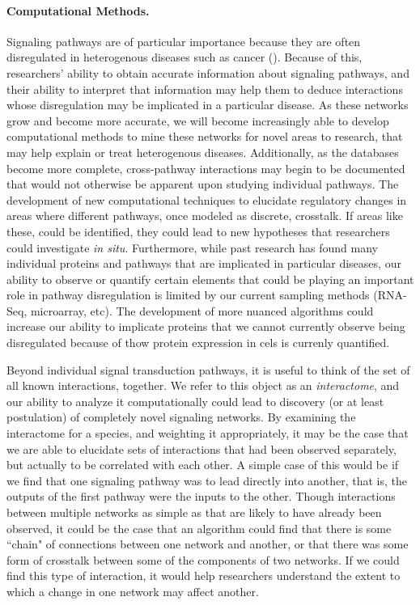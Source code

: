 \documentclass[12pt,twoside]{reedthesis}
\theoremstyle{definition}
\begin{document}
\paragraph{Computational Methods.}
Signaling pathways are of particular importance because they are often disregulated in heterogenous diseases such as cancer (\cite{Taylor2009}). Because of this, researchers' ability to obtain accurate information about signaling pathways, and their ability to interpret that information may help them to deduce interactions whose disregulation may be implicated in a particular disease. As these networks grow and become more accurate, we will become increasingly able to develop computational methods to mine these networks for novel areas to research, that may help explain or treat heterogenous diseases. Additionally, as the databases become more complete, cross-pathway interactions may begin to be documented that would not otherwise be apparent upon studying individual pathways. The development of new computational techniques to elucidate regulatory changes in areas where different pathways, once modeled as discrete, crosstalk. If areas like these, could be identified, they could lead to new hypotheses that researchers could investigate \textit{in situ}. Furthermore, while past research has found many individual proteins and pathways that are implicated in particular diseases, our ability to observe or quantify certain elements that could be playing an important role in pathway disregulation is limited by our current sampling methods (RNA-Seq, microarray, etc). The development of more nuanced algorithms could increase our ability to implicate proteins that we cannot currently observe being disregulated because of thow protein expression in cels is currenly quantified.\par

Beyond individual signal transduction pathways, it is useful to think of the set of all known interactions, together. We refer to this object as an \textit{interactome}, and our ability to analyze it computationally could lead to discovery (or at least postulation) of completely novel signaling networks. By examining the interactome for a species, and weighting it appropriately, it may be the case that we are able to elucidate sets of interactions that had been observed separately, but actually to be correlated with each other. A simple case of this would be if we find that one signaling pathway was to lead directly into another, that is, the outputs of the first pathway were the inputs to the other. Though interactions between multiple networks as simple as that are likely to have already been observed, it could be the case that an algorithm could find that there is some ``chain" of connections between one network and another, or that there was some form of crosstalk between some of the components of two networks. If we could find this type of interaction, it would help researchers understand the extent to which a change in one network may affect another.\par
\end{document}
